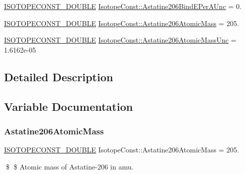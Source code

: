 \begin{DoxyCompactItemize}
\mbox{\hyperlink{group___isotope_const-_macros_ga8f45a7272ce02c0b4c65c44636ed719a}{I\+S\+O\+T\+O\+P\+E\+C\+O\+N\+S\+T\+\_\+\+D\+O\+U\+B\+LE}} \mbox{\hyperlink{group___isotope_const-_astatine-_at206_gade0992e34b70f41658f756a9ac681db5}{Isotope\+Const\+::\+Astatine206\+Bind\+E\+Per\+A\+Unc}} = 0.
\item 
\mbox{\hyperlink{group___isotope_const-_macros_ga8f45a7272ce02c0b4c65c44636ed719a}{I\+S\+O\+T\+O\+P\+E\+C\+O\+N\+S\+T\+\_\+\+D\+O\+U\+B\+LE}} \mbox{\hyperlink{group___isotope_const-_astatine-_at206_ga8dafae270305d53367c5ab91fa527db2}{Isotope\+Const\+::\+Astatine206\+Atomic\+Mass}} = 205.
\item 
\mbox{\hyperlink{group___isotope_const-_macros_ga8f45a7272ce02c0b4c65c44636ed719a}{I\+S\+O\+T\+O\+P\+E\+C\+O\+N\+S\+T\+\_\+\+D\+O\+U\+B\+LE}} \mbox{\hyperlink{group___isotope_const-_astatine-_at206_gafd6d7a201bbbc0df55b4a636222c5144}{Isotope\+Const\+::\+Astatine206\+Atomic\+Mass\+Unc}} = 1.\+6162e-\/05
\end{DoxyCompactItemize}


\subsection{Detailed Description}


\subsection{Variable Documentation}
\mbox{\label{group___isotope_const-_astatine-_at206_ga8dafae270305d53367c5ab91fa527db2}} 
\subsubsection{\texorpdfstring{Astatine206\+Atomic\+Mass}{Astatine206AtomicMass}}
{\footnotesize\ttfamily \mbox{\hyperlink{group___isotope_const-_macros_ga8f45a7272ce02c0b4c65c44636ed719a}{I\+S\+O\+T\+O\+P\+E\+C\+O\+N\+S\+T\+\_\+\+D\+O\+U\+B\+LE}} Isotope\+Const\+::\+Astatine206\+Atomic\+Mass = 205.}

\$ \$ Atomic mass of Astatine-\/206 in amu. \mbox{\label{group___isotope_const-_astatine-_at206_gafd6d7a201bbbc0df55b4a636222c5144}} 
